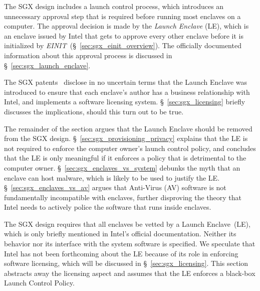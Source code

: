 \label{sec:sgx_launch_control}

The SGX design includes a launch control process, which introduces an
unnecessary approval step that is required before running most enclaves on a
computer. The approval decision is made by the \textit{Launch Enclave} (LE),
which is an enclave issued by Intel that gets to approve every other enclave
before it is initialized by \textit{EINIT}~(\S~\ref{sec:sgx_einit_overview}).
The officially documented information about this approval process is discussed
in \S~\ref{sec:sgx_launch_enclave}.


The SGX patents~\cite{intel2013patent1, intel2013patent2} disclose in no
uncertain terms that the Launch Enclave was introduced to ensure that each
enclave's author has a business relationship with Intel, and implements a
software licensing system. \S~\ref{sec:sgx_licensing} briefly discusses the
implications, should this turn out to be true.

The remainder of the section argues that the Launch Enclave should be removed
from the SGX design. \S~\ref{sec:sgx_provisioning_privacy} explains that the
LE is not required to enforce the computer owner's launch control policy, and
concludes that the LE is only meaningful if it enforces a policy that is
detrimental to the computer owner. \S~\ref{sec:sgx_enclaves_vs_system} debunks
the myth that an enclave can host malware, which is likely to be used to
justify the LE. \S~\ref{sec:sgx_enclaves_vs_av} argues that Anti-Virus (AV)
software is not fundamentally incompatible with enclaves, further disproving
the theory that Intel needs to actively police the software that runs inside
enclaves.


\label{sec:sgx_launch_enclave}


The SGX design requires that all enclaves be vetted by a Launch Enclave~(LE),
which is only briefly mentioned in Intel's official documentation. Neither its
behavior nor its interface with the system software is specified. We speculate
that Intel has not been forthcoming about the LE because of its role in
enforcing software licensing, which will be discussed in
\S~\ref{sec:sgx_licensing}. This section abstracts away the licensing aspect
and assumes that the LE enforces a black-box Launch Control Policy.

